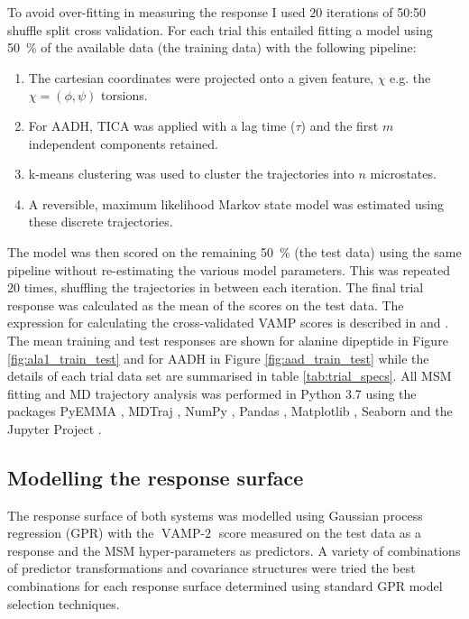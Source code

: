 To avoid over-fitting in measuring the response I used $20$ iterations of 50:50 shuffle split cross validation. For each trial this entailed fitting a model using \SI{50}{\percent} of the available data (the training data) with the following pipeline:

\begin{enumerate}
    \item \label{lst:modfititem1} The cartesian coordinates were projected onto a given feature, $\chi$ e.g. the $\chi = (\phi, \psi)$ torsions. 
    \item \label{lst:modfititem2} For AADH, TICA was applied with a lag time ($\tau$) and the first $m$ independent components retained. 
    \item \label{lst:modfititem3} k-means clustering was used to cluster the trajectories into $n$ microstates.
    \item \label{lst:modfititem4} A reversible, maximum likelihood Markov state model was estimated using these discrete trajectories. 
\end{enumerate}

The model was then scored on the remaining \SI{50}{\percent} (the test data) using the same pipeline without re-estimating the various model parameters. This was repeated $20$ times, shuffling the trajectories in between each iteration.  The final trial response was calculated as the mean of the scores on the test data. The expression for calculating the cross-validated VAMP scores is described in \cite{mcgibbonVariationalCrossvalidationSlow2015} and \cite{wuVariationalApproachLearning2019}.  The mean training and test responses are shown for alanine dipeptide in Figure \ref{fig:ala1_train_test} and for AADH in Figure \ref{fig:aad_train_test} while the details of each trial data set are summarised in table \ref{tab:trial_specs}. All MSM fitting and MD trajectory analysis was performed in Python 3.7 using the packages PyEMMA \cite{schererPyEMMASoftwarePackage2015a}, MDTraj \cite{mcgibbonMDTrajModernOpen2015}, NumPy \cite{waltNumPyArrayStructure2011}, Pandas \cite{mckinneyPandasFoundationalPython2011}, Matplotlib \cite{hunterMatplotlib2DGraphics2007},  Seaborn \cite{michaelwaskomMwaskomSeabornV02020} and the Jupyter Project \cite{kluyverJupyterNotebooksPublishing2016}. 

\subsection{Modelling the response surface}\label{subsec:rsm}
The response surface of both systems was modelled using Gaussian process regression (GPR) with the $\operatorname{VAMP-2}$ score measured on the test data as a response and the MSM hyper-parameters as predictors. A variety of combinations of predictor transformations and covariance structures were tried the best combinations for each response surface determined using standard GPR model selection techniques. 

